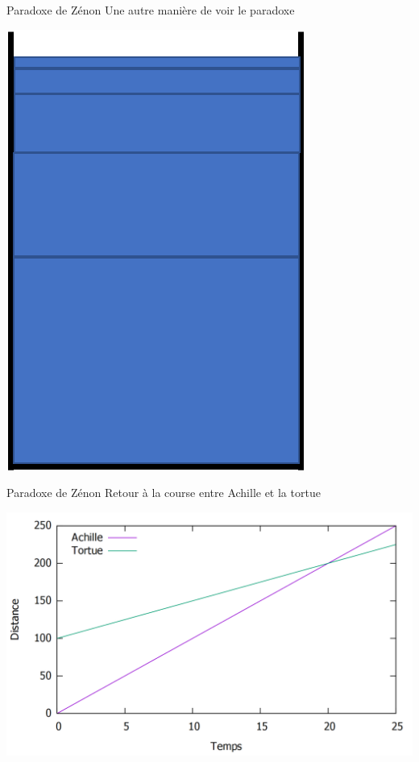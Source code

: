 \documentclass[usenames, dvipsnames]{beamer}
\begin{document}
\begin{frame}[plain]{Paradoxe de Zénon}
Une autre manière de voir le paradoxe
\begin{center}
\includegraphics[scale=0.5]{images/glass5.png}
\end{center}
\end{frame}




\begin{frame}[plain]{Paradoxe de Zénon}
Retour à la course entre Achille et la tortue 
\pause
\begin{center}
\includegraphics[scale=0.35]{images/ZAPT2.png}
\end{center}
\end{frame}
\end{document}
